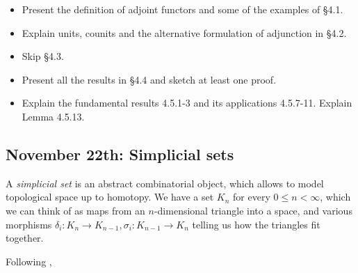 \documentclass{amsart}
\theoremstyle{definition}
\theoremstyle{remark}
\begin{document}
\begin{itemize}
\item Present the definition of adjoint functors and some of the examples of \S 4.1.
\item Explain units, counits and the alternative formulation of adjunction in \S 4.2.
\item Skip \S 4.3.
\item Present all the results in \S 4.4 and sketch at least one proof.
\item Explain the fundamental results 4.5.1-3 and its applications 4.5.7-11. Explain Lemma 4.5.13.
\end{itemize}




\subsection{November 22th: Simplicial sets}

A \emph{simplicial set} is an abstract combinatorial object, which allows to model topological space up to homotopy. We have a set $K_n$ for every $0 \leq n < \infty$, which we can think of as maps from an $n$-dimensional triangle into a space, and various morphisms $\delta_i: K_n \to K_{n-1}, \sigma_i: K_{n-1} \to K_n$ telling us how the triangles fit together.

Following \cite{Riehl_elementary},
\end{document}
